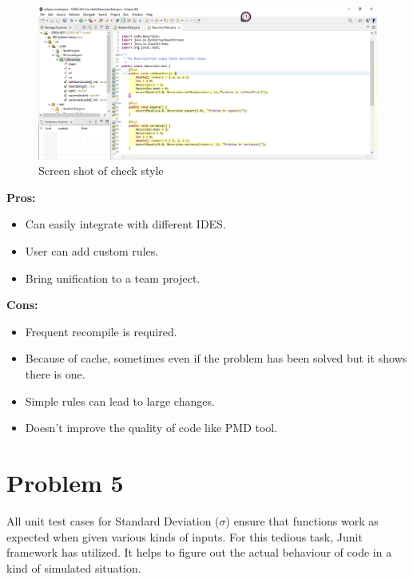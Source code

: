 \documentclass{scrartcl}
\begin{document}
\begin{figure}[H]
    \centering
    \includegraphics[width=1\textwidth]{Graphics/check style.png}
    \caption{Screen shot of check style}
    \label{fig:check style}
\end{figure}

\begin{Large}
\vspace{0.5cm}
\textbf{Pros:}
\begin{itemize}
  \item Can easily integrate with different IDES.  
  \item User can add custom rules.  
  \item Bring unification to a team project. 
\end{itemize}
\end{Large}

\begin{Large}
\vspace{0.5cm}
\textbf{Cons:}
\begin{itemize}
  \item Frequent recompile is required.
  \item Because of cache, sometimes even if the problem has been solved but it shows there is one. 
  \item Simple rules can lead to large changes. 
  \item Doesn't improve the quality of code like PMD tool. 
\end{itemize}
\end{Large}

\newpage

\section{Problem 5}

\begin{spacing}{1.5}
\begin{Large}
All unit test cases for Standard Deviation ($\sigma$) ensure that functions work as expected when given various kinds of inputs. For this tedious task, Junit framework has utilized. It helps to figure out the actual behaviour of code in a kind of simulated situation.   
\end{Large}
\end{spacing}
\end{document}
